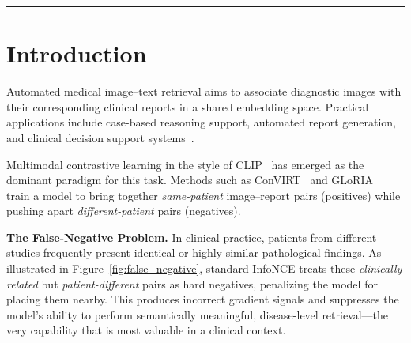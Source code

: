 \documentclass[11pt, a4paper]{article}
\begin{document}
\begin{titlepage}
\begin{minipage}{0.85\textwidth}
\begin{abstract}
      \medskip
      \noindent\textbf{Keywords:}
      medical image--text retrieval,
      contrastive learning,
      false negatives,
      pathology clustering,
      chest X-ray,
      SwinV2,
      ClinicalBERT,
      curriculum learning.
    \end{abstract}
  \end{minipage}

  \vspace{0.8em}
  \rule{0.8\textwidth}{0.4pt}
\end{titlepage}

\tableofcontents
\newpage

\section{Introduction}
\label{sec:intro}

Automated medical image--text retrieval aims to associate diagnostic images
with their corresponding clinical reports in a shared embedding space.
Practical applications include case-based reasoning support, automated
report generation, and clinical decision support
systems~\citep{jing2018automatic}.

Multimodal contrastive learning in the style of
CLIP~\citep{radford2021learning} has emerged as the dominant paradigm for
this task. Methods such as ConVIRT~\citep{zhang2022contrastive} and
GLoRIA~\citep{huang2021gloria} train a model to bring together
\emph{same-patient} image--report pairs (positives) while pushing apart
\emph{different-patient} pairs (negatives).

\textbf{The False-Negative Problem.}
In clinical practice, patients from different studies frequently present
identical or highly similar pathological findings.
As illustrated in Figure~\ref{fig:false_negative}, standard InfoNCE treats
these \emph{clinically related} but \emph{patient-different} pairs as hard
negatives, penalizing the model for placing them nearby.
This produces incorrect gradient signals and suppresses the model's ability
to perform semantically meaningful, disease-level retrieval---the very
capability that is most valuable in a clinical context.
\end{document}
